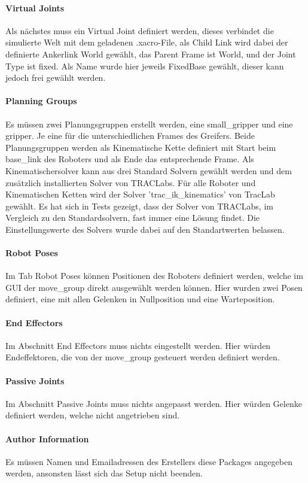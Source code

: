 \paragraph{Virtual Joints} Als nächstes muss ein Virtual Joint definiert werden, dieses verbindet die simulierte Welt mit dem geladenen .xacro-File, als Child Link wird dabei der definierte Ankerlink World gewählt, das Parent Frame ist World, und der Joint Type ist fixed. Als Name wurde hier jeweils FixedBase gewählt, dieser kann jedoch frei gewählt werden.
\paragraph{Planning Groups}
Es müssen zwei Planungsgruppen erstellt werden, eine small\_gripper und eine gripper. Je eine für die unterschiedlichen Frames des Greifers. Beide Planungsgruppen werden als Kinematische Kette definiert mit Start beim base\_link des Roboters und als Ende das entsprechende Frame. Als Kinematischersolver kann aus drei Standard Solvern gewählt werden und dem zusätzlich installierten Solver von TRACLabs. Für alle Roboter und Kinematischen Ketten wird der Solver 'trac\_ik\_kinematics' von TracLab gewählt. Es hat sich in Tests gezeigt, dass der Solver von TRACLabs, im Vergleich zu den Standardsolvern, fast immer eine Lösung findet. Die Einstellungswerte des Solvers wurde dabei auf den Standartwerten belassen.
\paragraph{Robot Poses}
Im Tab Robot Poses können Positionen des Roboters definiert werden, welche im \gls{GUI} der move\_group direkt ausgewählt werden können. Hier wurden zwei Posen definiert, eine mit allen Gelenken in Nullposition und eine Warteposition. 
\paragraph{End Effectors}
Im Abschnitt End Effectors muss nichts eingestellt werden. Hier würden Endeffektoren, die von der move\_group gesteuert werden definiert werden.
\paragraph{Passive Joints}
Im Abschnitt Passive Joints muss nichts angepasst werden. Hier würden Gelenke definiert werden, welche nicht angetrieben sind.
\paragraph{Author Information}
Es müssen Namen und Emailadressen des Erstellers diese Packages angegeben werden, ansonsten lässt sich das Setup nicht beenden.

